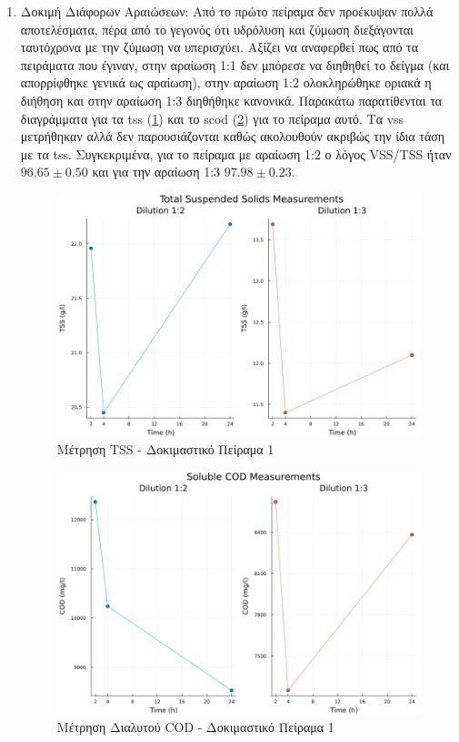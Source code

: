 \documentclass[11pt]{report}
\begin{document}
\begin{enumerate}
\item Δοκιμή Διάφορων Αραιώσεων:
\label{sec:orgb2b9989}
Από το πρώτο πείραμα δεν προέκυψαν πολλά αποτελέσματα, πέρα από το γεγονός ότι υδρόλυση και ζύμωση διεξάγονται ταυτόχρονα με την ζύμωση να υπερισχύει. Αξίζει να αναφερθεί πως από τα πειράματα που έγιναν, στην αραίωση 1:1 δεν μπόρεσε να διηθηθεί το δείγμα (και απορρίφθηκε γενικά ως αραίωση), στην αραίωση 1:2 ολοκληρώθηκε οριακά η διήθηση και στην αραίωση 1:3 διηθήθηκε κανονικά. Παρακάτω παρατίθενται τα διαγράμματα για τα \acrfull{tss} (\ref{fig:org4edb6f5}) και το \acrfull{scod} (\ref{fig:org1f1ed2a}) για το πείραμα αυτό. Τα \acrfull{vss} μετρήθηκαν αλλά δεν παρουσιάζονται καθώς ακολουθούν ακριβώς την ίδια τάση με τα \acrfull{tss}. Συγκεκριμένα, για το πείραμα με αραίωση 1:2 ο λόγος VSS/TSS ήταν \(96.65 \pm 0.50\) και για την αραίωση 1:3 \(97.98 \pm 0.23\). 

\begin{figure}[htbp]
\centering
\includegraphics[width=.9\linewidth]{../plots/10_10/tss_plot.png}
\caption{\label{fig:org4edb6f5}Μέτρηση TSS - Δοκιμαστικό Πείραμα 1}
\end{figure}

\begin{figure}[htbp]
\centering
\includegraphics[width=.9\linewidth]{../plots/10_10/COD_plot.png}
\caption{\label{fig:org1f1ed2a}Μέτρηση Διαλυτού COD - Δοκιμαστικό Πείραμα 1}
\end{figure}


\end{enumerate}
\end{document}
